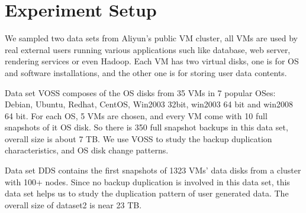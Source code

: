 \section{Experiment Setup}
We sampled two data sets from Aliyun's public VM cluster, all VMs
are used by real external users running various applications such like
database, web server, rendering services or even Hadoop. Each VM has
two virtual disks, one is for OS and software installations, and the other one
is for storing user data contents.

Data set VOSS composes of the OS disks from 35 VMs in 7 popular OSes: 
Debian, Ubuntu, Redhat, CentOS, Win2003 32bit, win2003 64 bit and win2008 64 bit. For each OS, 
5 VMs are chosen, and every VM come with 10 full snapshots of it OS disk. So
there is 350 full snapshot backups in this data set, overall size is about 7 TB.
We use VOSS to study the backup duplication characteristics, and OS disk change patterns.

Data set DDS contains the first snapshots of 1323 VMs' data disks from a cluster with 100+ nodes. 
Since no backup duplication is involved in this data set, this data set helps us to 
study the duplication pattern of user generated data. The overall size of dataset2 is near 23 TB.